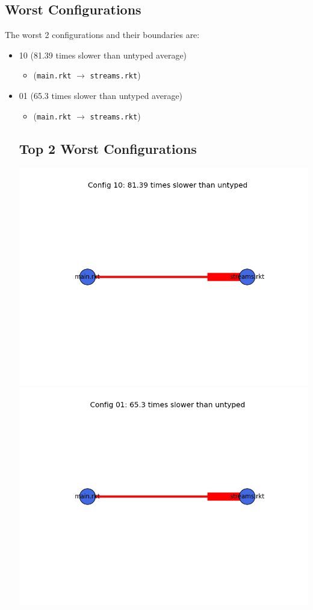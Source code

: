 \documentclass{article}
\newcommand{\mono}[1]{\texttt{#1}}
\begin{document}
\subsection{Worst Configurations}
The worst 2 configurations and their boundaries are:
\begin{itemize}
\item 10 (81.39 times slower than untyped average)
  \begin{itemize}
  \item (\mono{main.rkt} $\rightarrow$ \mono{streams.rkt})
  \end{itemize}
\item 01 (65.3 times slower than untyped average)
  \begin{itemize}
  \item (\mono{main.rkt} $\rightarrow$ \mono{streams.rkt})
  \end{itemize}

\subsection{Top 2 Worst Configurations}
\includegraphics[width=\textwidth]{sieve-module-graph-10.png}
\includegraphics[width=\textwidth]{sieve-module-graph-01.png}
\end{itemize}
\end{document}
